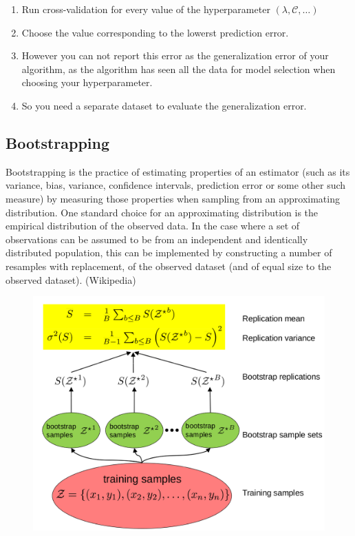 \documentclass[MachineLearning]{subfiles}
\begin{document}
\begin{enumerate}
\item Run cross-validation for every value of the hyperparameter \((\lambda,\mathcal{C},\ldots)\)
\item Choose the value corresponding to the lowerst prediction error.
\item However you can not report this error as the generalization error of your algorithm, as the algorithm has seen all the data for model selection when choosing your hyperparameter.
\item So you need a separate dataset to evaluate the generalization error.
\end{enumerate}


\subsection{Bootstrapping}
Bootstrapping is the practice of estimating properties of an estimator (such as its variance, bias, variance, confidence intervals, prediction error or some other such measure) by measuring those properties when sampling from an approximating distribution. One standard choice for an approximating distribution is the empirical distribution of the observed data. In the case where a set of observations can be assumed to be from an independent and identically distributed population, this can be implemented by constructing a number of resamples with replacement, of the observed dataset (and of equal size to the observed dataset). (Wikipedia)

\begin{figure}[H]
\centering
\includegraphics[width=0.8\linewidth]{figs/bootstrapping-process}
\end{figure}
\end{document}
